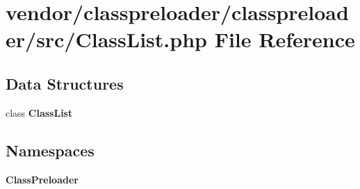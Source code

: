 \section{vendor/classpreloader/classpreloader/src/\+Class\+List.php File Reference}
\label{_class_list_8php}
\subsection*{Data Structures}
\begin{DoxyCompactItemize}
\item 
class {\bf Class\+List}
\end{DoxyCompactItemize}
\subsection*{Namespaces}
\begin{DoxyCompactItemize}
\item 
 {\bf Class\+Preloader}
\end{DoxyCompactItemize}
